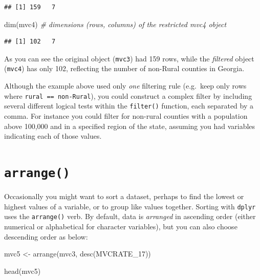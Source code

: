 \documentclass[
]{book}
\newenvironment{Shaded}{\begin{snugshade}}{\end{snugshade}}
\newcommand{\CommentTok}[1]{\textcolor[rgb]{0.56,0.35,0.01}{\textit{#1}}}
\newcommand{\FunctionTok}[1]{\textcolor[rgb]{0.00,0.00,0.00}{#1}}
\newcommand{\NormalTok}[1]{#1}
\newcommand{\OtherTok}[1]{\textcolor[rgb]{0.56,0.35,0.01}{#1}}
\newenvironment{rmdnote}[1]
  {
  \begin{itemize}
  \renewcommand{\labelitemi}{
    \raisebox{-.7\height}[0pt][0pt]{
      {\setkeys{Gin}{width=3em,keepaspectratio}\texttt{[image: images/\#1]}}
    }
  }
  \setlength{\fboxsep}{1em}
  \begin{note}
  \item
  }
  {
  \end{note}
  \end{itemize}
  }
\begin{document}
\begin{verbatim}
## [1] 159   7
\end{verbatim}

\begin{Shaded}
\begin{Highlighting}[]
\FunctionTok{dim}\NormalTok{(mvc4) }\CommentTok{\# dimensions (rows, columns) of the restricted mvc4 object}
\end{Highlighting}
\end{Shaded}

\begin{verbatim}
## [1] 102   7
\end{verbatim}

As you can see the original object (\texttt{mvc3}) had 159 rows, while the \emph{filtered} object (\texttt{mvc4}) has only 102, reflecting the number of non-Rural counties in Georgia.

\begin{rmdnote}{note}
Although the example above used only \emph{one} filtering rule (e.g.~keep only rows where \texttt{rural\ ==\ \textquotesingle{}non-Rural\textquotesingle{}}), you could construct a complex filter by including several different logical tests within the \texttt{filter()} function, each separated by a comma. For instance you could filter for non-rural counties with a population above 100,000 and in a specified region of the state, assuming you had variables indicating each of those values.

\end{rmdnote}

\hypertarget{arrange}{%
\section{\texorpdfstring{\texttt{arrange()}}{arrange()}}\label{arrange}}

Occasionally you might want to sort a dataset, perhaps to find the lowest or highest values of a variable, or to group like values together. Sorting with \texttt{dplyr} uses the \texttt{arrange()} verb. By default, data is \emph{arranged} in ascending order (either numerical or alphabetical for character variables), but you can also choose descending order as below:

\begin{Shaded}
\begin{Highlighting}[]
\NormalTok{mvc5 }\OtherTok{\textless{}{-}} \FunctionTok{arrange}\NormalTok{(mvc3, }\FunctionTok{desc}\NormalTok{(MVCRATE\_17))}

\FunctionTok{head}\NormalTok{(mvc5)}
\end{Highlighting}
\end{Shaded}
\end{document}
